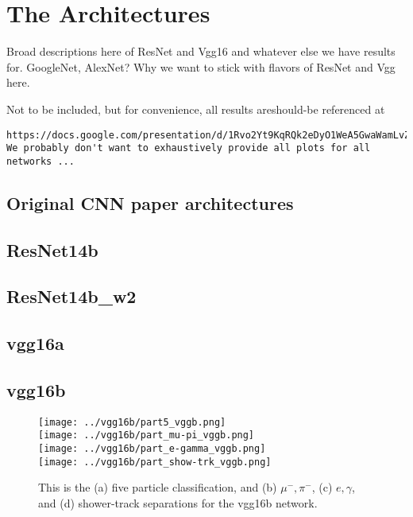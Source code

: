 \documentclass[11pt,a4paper]{article}
\begin{document}
\section {The Architectures}

Broad descriptions here of ResNet and Vgg16 and whatever else we have results for.  GoogleNet, AlexNet?
Why we want to stick with flavors of ResNet and Vgg here.

{\color{red} Not to be included, but for convenience, all results are\/should-be referenced at 
\begin{verbatim}https://docs.google.com/presentation/d/1Rvo2Yt9KqRQk2eDyO1WeA5GwaWamLvZR2CR3txfYbBE/edit#slide=id.g1ec338afdf_0_11. We probably don't want to exhaustively provide all plots for all networks ...
\end{verbatim}
}

\subsection{Original CNN paper architectures}

\subsection{ResNet14b}

\subsection{ResNet14b\_w2}


\subsection{vgg16a}

\subsection{vgg16b}

\begin{figure}[t]
  \centering  
\texttt{[image: ../vgg16b/part5\_vggb.png]}\\
\texttt{[image: ../vgg16b/part\_mu-pi\_vggb.png]}\\
\texttt{[image: ../vgg16b/part\_e-gamma\_vggb.png]}\\
\texttt{[image: ../vgg16b/part\_show-trk\_vggb.png]}
\caption{This is the (a) five particle classification, and (b) $\mu^-,\pi^-$, (c) $e,\gamma$, and (d) shower-track separations for the vgg16b network.}
  \label{fig:vgg16b}
\end{figure}
\end{document}
